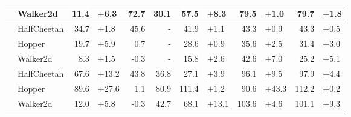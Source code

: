 \documentclass{article}
\begin{document}
\begin{table}[]
\begin{tabular}{c@{\hspace{5pt}}lr@{\hspace{-1pt}}lrrr@{\hspace{-1pt}}lr@{\hspace{-1pt}}lr@{\hspace{-1pt}}l}
          						  & Walker2d    & \colorbox{white}{11.4}  & {\color[HTML]{525252} $\pm$6.3}  & \colorbox{mine}{72.7} & 30.1                 & \colorbox{white}{57.5}  & {\color[HTML]{525252} $\pm$8.3}  & \colorbox{mine}{79.5}  & {\color[HTML]{525252} $\pm$1.0}  & \colorbox{mine}{79.7}  & {\color[HTML]{525252} $\pm$1.8} \\
\midrule
{} & HalfCheetah & \colorbox{white}{34.7}  & {\color[HTML]{525252} $\pm$1.8}  & \colorbox{mine}{45.6} & -                    & \colorbox{mine}{41.9}   & {\color[HTML]{525252} $\pm$1.1}  & \colorbox{mine}{43.3}  & {\color[HTML]{525252} $\pm$0.9}  & \colorbox{mine}{43.3}  & {\color[HTML]{525252} $\pm$0.5} \\
                                  & Hopper      & \colorbox{white}{19.7}  & {\color[HTML]{525252} $\pm$5.9}  & 0.7                   & -                    & \colorbox{white}{28.6}  & {\color[HTML]{525252} $\pm$0.9}  & \colorbox{mine}{35.6}  & {\color[HTML]{525252} $\pm$2.5}  & \colorbox{mine}{31.4}  & {\color[HTML]{525252} $\pm$3.0} \\
								  & Walker2d    & \colorbox{white}{8.3}   & {\color[HTML]{525252} $\pm$1.5}  & -0.3                  & -                    & \colorbox{white}{15.8}  & {\color[HTML]{525252} $\pm$2.6}  & \colorbox{mine}{42.6}  & {\color[HTML]{525252} $\pm$7.0}  & \colorbox{white}{25.2} & {\color[HTML]{525252} $\pm$5.1} \\
\midrule
{} & HalfCheetah & \colorbox{white}{67.6}  & {\color[HTML]{525252} $\pm$13.2} & 43.8                  & 36.8                 & \colorbox{white}{27.1}  & {\color[HTML]{525252} $\pm$3.9}  & \colorbox{mine}{96.1}  & {\color[HTML]{525252} $\pm$9.5}  & \colorbox{mine}{97.9}  & {\color[HTML]{525252} $\pm$4.4} \\
                                  & Hopper      & \colorbox{white}{89.6}  & {\color[HTML]{525252} $\pm$27.6} & 1.1                   & 80.9                 & \colorbox{mine}{111.4}  & {\color[HTML]{525252} $\pm$1.2}  & \colorbox{white}{90.6} & {\color[HTML]{525252} $\pm$43.3} & \colorbox{mine}{112.2} & {\color[HTML]{525252} $\pm$0.2} \\
								  & Walker2d    & \colorbox{white}{12.0}  & {\color[HTML]{525252} $\pm$5.8}  & -0.3                  & 42.7                 & \colorbox{white}{68.1}  & {\color[HTML]{525252} $\pm$13.1} & \colorbox{mine}{103.6} & {\color[HTML]{525252} $\pm$4.6}  & \colorbox{mine}{101.1} & {\color[HTML]{525252} $\pm$9.3} \\

\end{tabular}
\end{table}
\end{document}
